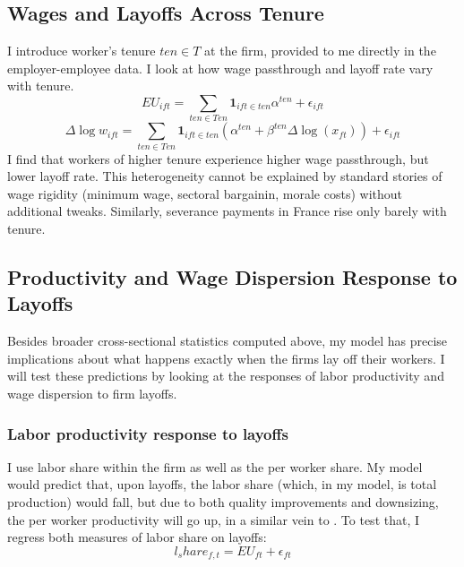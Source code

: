 \subsection*{Wages and Layoffs Across Tenure} %
I introduce worker's tenure $ten \in T$ at the firm, provided to me directly in the employer-employee data. I look at how wage passthrough and layoff rate vary with tenure.
\[ EU_{ift} = \sum_{ten \in Ten} \mathbf{1}_{ift \in ten}\alpha^{ten}  + \epsilon_{ift}\] 
\[ \Delta \log w_{ift} = \sum_{ten \in Ten} \mathbf{1}_{ift \in ten}(\alpha^{ten} + \beta^{ten}\Delta \log(x_{ft})) + \epsilon_{ift} \] 
I find that workers of higher tenure experience higher wage passthrough, but lower layoff rate. This heterogeneity cannot be explained by standard stories of wage rigidity (minimum wage, sectoral bargainin, morale costs) without additional tweaks. Similarly, severance payments in France rise only barely with tenure.
\subsection*{Productivity and Wage Dispersion Response to Layoffs}
 Besides broader cross-sectional statistics computed above, my model has precise implications about what happens exactly when the firms lay off their workers. I will test these predictions by looking at the responses of labor productivity and wage dispersion to firm layoffs.
\subsubsection*{Labor productivity response to layoffs} %
I use labor share within the firm as well as the per worker share. My model would predict that, upon layoffs, the labor share (which, in my model, is total production) would fall, but due to both quality improvements and downsizing, the per worker productivity will go up, in a similar vein to \textcite{berger2011}. To test that, I regress both measures of labor share on layoffs:
\[ l_share_{f,t} = EU_{ft} + \epsilon_{ft}\]

